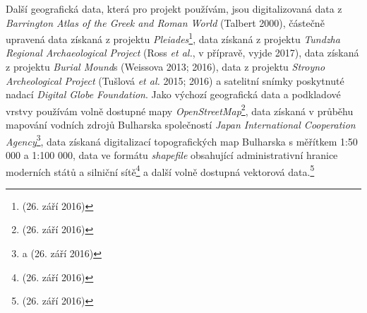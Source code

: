 Další geografická data, která pro projekt používám, jsou digitalizovaná data z {\em Barrington Atlas of the Greek and Roman World} (Talbert 2000), částečně upravená data získaná z projektu {\em Pleiades}\footnote{\from[url9] (26. září 2016)}, data získaná z projektu {\em Tundzha Regional Archaeological Project} (Ross {\em et al.}, v přípravě, vyjde 2017), data získaná z projektu {\em Burial Mound}s (Weissova 2013; 2016), data z projektu {\em Stroyno Archeological Project} (Tušlová {\em et al.} 2015; 2016) a satelitní snímky poskytnuté nadací {\em Digital Globe Foundation}. Jako výchozí geografická data a podkladové vrstvy používám volně dostupné mapy {\em OpenStreetMap}\footnote{\from[url10] (26. září 2016)}, data získaná v průběhu mapování vodních zdrojů Bulharska společností {\em Japan International Cooperation Agency}\footnote{\from[url11] a \from[url12] (26. září 2016)}, data získaná digitalizací topografických map Bulharska s měřítkem 1:50 000 a 1:100 000, data ve formátu {\em shapefile} obsahující administrativní hranice moderních států a silniční sítě\footnote{\from[url13] (26. září 2016)} a další volně dostupná vektorová data.\footnote{\from[url14] (26. září 2016)}

